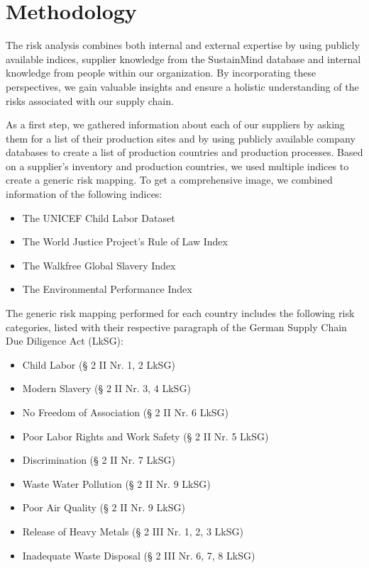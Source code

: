 \documentclass{article}
\begin{document}
\section{Methodology}

The risk analysis combines both internal and external expertise by using publicly available indices, supplier knowledge from the SustainMind database and internal
knowledge from people within our organization. By incorporating these perspectives, we gain valuable insights and ensure a holistic understanding of the risks
associated with our supply chain.

As a first step, we gathered information about each of our suppliers by asking them for a list of their production sites and by using publicly available company databases
to create a list of production countries and production processes. Based on a supplier's inventory and production countries, we used multiple indices to
create a generic risk mapping. To get a comprehensive image, we combined information of the following indices:

\begin{itemize}
    \item The UNICEF Child Labor Dataset
    \item The World Justice Project's Rule of Law Index
    \item The Walkfree Global Slavery Index
    \item The Environmental Performance Index
\end{itemize}

The generic risk mapping performed for each country includes the following risk categories, listed with their respective paragraph of the German Supply Chain Due Diligence Act (LkSG):
\begin{itemize}
    \item Child Labor (§ 2 II Nr. 1, 2 LkSG)
    \item Modern Slavery (§ 2 II Nr. 3, 4 LkSG)
    \item No Freedom of Association (§ 2 II Nr. 6 LkSG)
    \item Poor Labor Rights and Work Safety (§ 2 II Nr. 5 LkSG)
    \item Discrimination (§ 2 II Nr. 7 LkSG)
    \item Waste Water Pollution (§ 2 II Nr. 9 LkSG)
    \item Poor Air Quality (§ 2 II Nr. 9 LkSG)
    \item Release of Heavy Metals (§ 2 III Nr. 1, 2, 3 LkSG)
    \item Inadequate Waste Disposal (§ 2 III Nr. 6, 7, 8 LkSG)
\end{itemize}
\end{document}
